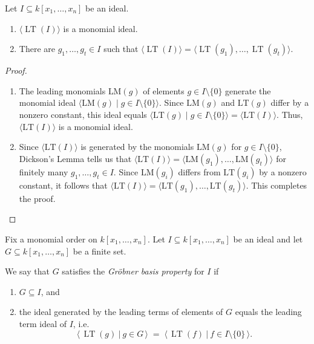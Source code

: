 \begin{theorem} %
    \label{thm:initialIdeal_is_FG}
    \leanok 
    Let $I \subseteq k[x_1, \ldots , x_n]$ be an ideal.
    \begin{enumerate}
        \item $\langle\operatorname{LT}(I)\rangle$ is a monomial ideal.
        \item There are $g_1, \ldots , g_t \in I$ such that $\langle \operatorname{LT}(I)\rangle = \langle \operatorname{LT}(g_1), \ldots , \operatorname{LT}(g_t)\rangle$.
    \end{enumerate}
\end{theorem}
\begin{proof}
\leanok
\begin{enumerate}
    \item The leading monomials $\text{LM}(g)$ of elements $g \in I \setminus \{0\}$ generate the monomial ideal $\langle \text{LM}(g) \mid g \in I \setminus \{0\} \rangle$. 
      Since $\text{LM}(g)$ and $\text{LT}(g)$ differ by a nonzero constant, this ideal equals $\langle \text{LT}(g) \mid g \in I \setminus \{0\} \rangle = \langle \text{LT}(I) \rangle$. 
      Thus, $\langle \text{LT}(I) \rangle$ is a monomial ideal.
    \item Since $\langle \text{LT}(I) \rangle$ is generated by the monomials $\text{LM}(g)$ for $g \in I \setminus \{0\}$, Dickson's Lemma tells us that $\langle \text{LT}(I) \rangle = \langle \text{LM}(g_1), \dots, \text{LM}(g_t) \rangle$ for finitely many $g_1, \dots, g_t \in I$. 
      Since $\text{LM}(g_i)$ differs from $\text{LT}(g_i)$ by a nonzero constant, it follows that $\langle \text{LT}(I) \rangle = \langle \text{LT}(g_1), \dots, \text{LT}(g_t) \rangle$. 
      This completes the proof.
\end{enumerate}
\end{proof}

\begin{definition}\label{def:GroebnerBasis_prop}
  \leanok
  Fix a monomial order on $k[x_1,\dots,x_n]$.  
  Let $I \subseteq k[x_1,\dots,x_n]$ be an ideal and let $G \subseteq k[x_1,\dots,x_n]$ be a finite set.

  We say that $G$ satisfies the \emph{Gr\"obner basis property} for $I$ if
  \begin{enumerate}
    \item $G \subseteq I$, and
    \item the ideal generated by the leading terms of elements of $G$ equals the leading term ideal of $I$, i.e.
    \[
      \big\langle\, \operatorname{LT}(g)\ \big|\ g\in G \,\big\rangle
      \;=\;
      \big\langle\, \operatorname{LT}(f)\ \big|\ f\in I\setminus\{0\} \,\big\rangle .
    \]
  \end{enumerate}
\end{definition}

